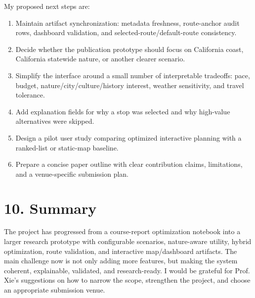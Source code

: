 \documentclass[11pt,a4paper]{article}
\begin{document}
\noindent My proposed next steps are:

\begin{enumerate}
    \item Maintain artifact synchronization: metadata freshness, route-anchor audit rows, dashboard validation, and selected-route/default-route consistency.
    \item Decide whether the publication prototype should focus on California coast, California statewide nature, or another clearer scenario.
    \item Simplify the interface around a small number of interpretable tradeoffs: pace, budget, nature/city/culture/history interest, weather sensitivity, and travel tolerance.
    \item Add explanation fields for why a stop was selected and why high-value alternatives were skipped.
    \item Design a pilot user study comparing optimized interactive planning with a ranked-list or static-map baseline.
    \item Prepare a concise paper outline with clear contribution claims, limitations, and a venue-specific submission plan.
\end{enumerate}

\section*{10. Summary}

\noindent The project has progressed from a course-report optimization notebook into a larger research prototype with configurable scenarios, nature-aware utility, hybrid optimization, route validation, and interactive map/dashboard artifacts. The main challenge now is not only adding more features, but making the system coherent, explainable, validated, and research-ready. I would be grateful for Prof. Xie's suggestions on how to narrow the scope, strengthen the project, and choose an appropriate submission venue.
\end{document}
